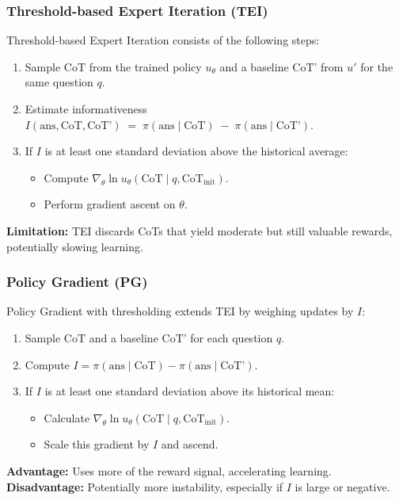 \documentclass{article}
\theoremstyle{plain}
\theoremstyle{definition}
\theoremstyle{remark}
\begin{document}
\subsubsection{Threshold-based Expert Iteration (TEI)}
\label{subsubsec:tei}
Threshold-based Expert Iteration consists of the following steps:
\begin{enumerate}
    \item Sample $\text{CoT}$ from the trained policy $u_\theta$ and a baseline $\text{CoT'}$ from $u'$ for the same question $q$.
    \item Estimate informativeness $I(\text{ans}, \text{CoT}, \text{CoT'}) \;=\; \pi(\text{ans}\mid \text{CoT}) \;-\; \pi(\text{ans}\mid \text{CoT'})$.
    \item If $I$ is at least one standard deviation above the historical average:
        \begin{itemize}
            \item Compute $\nabla_\theta \ln u_\theta(\text{CoT} \mid q, \text{CoT}_{\text{init}})$.
            \item Perform gradient ascent on $\theta$.
        \end{itemize}
\end{enumerate}
\noindent
\textbf{Limitation:} TEI discards CoTs that yield moderate but still valuable rewards, potentially slowing learning.

\subsubsection{Policy Gradient (PG)}
\label{subsubsec:pg}
Policy Gradient with thresholding extends TEI by weighing updates by $I$:
\begin{enumerate}
    \item Sample $\text{CoT}$ and a baseline $\text{CoT'}$ for each question $q$.
    \item Compute $I = \pi(\text{ans}\mid \text{CoT}) - \pi(\text{ans}\mid \text{CoT'})$.
    \item If $I$ is at least one standard deviation above its historical mean:
        \begin{itemize}
            \item Calculate $\nabla_\theta \ln u_\theta(\text{CoT} \mid q, \text{CoT}_{\text{init}})$.
            \item Scale this gradient by $I$ and ascend.
        \end{itemize}
\end{enumerate}
\noindent
\textbf{Advantage:} Uses more of the reward signal, accelerating learning. \\
\textbf{Disadvantage:} Potentially more instability, especially if $I$ is large or negative.
\end{document}
